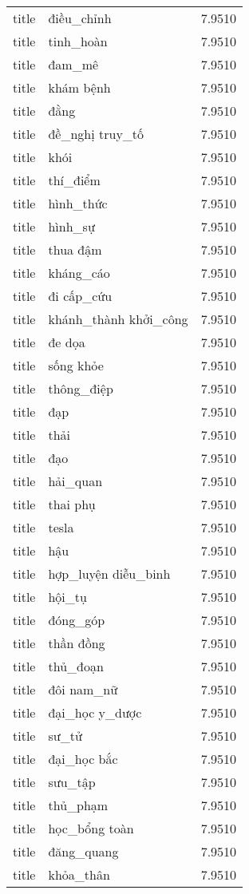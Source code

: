\documentclass{article}
\begin{document}
\begin{tabular}{lll}
title & điều\_chỉnh & 7.9510\\
title & tinh\_hoàn & 7.9510\\
title & đam\_mê & 7.9510\\
title & khám bệnh & 7.9510\\
title & đằng & 7.9510\\
title & đề\_nghị truy\_tố & 7.9510\\
title & khói & 7.9510\\
title & thí\_điểm & 7.9510\\
title & hình\_thức & 7.9510\\
title & hình\_sự & 7.9510\\
title & thua đậm & 7.9510\\
title & kháng\_cáo & 7.9510\\
title & đi cấp\_cứu & 7.9510\\
title & khánh\_thành khởi\_công & 7.9510\\
title & đe dọa & 7.9510\\
title & sống khỏe & 7.9510\\
title & thông\_điệp & 7.9510\\
title & đạp & 7.9510\\
title & thải & 7.9510\\
title & đạo & 7.9510\\
title & hải\_quan & 7.9510\\
title & thai phụ & 7.9510\\
title & tesla & 7.9510\\
title & hậu & 7.9510\\
title & hợp\_luyện diễu\_binh & 7.9510\\
title & hội\_tụ & 7.9510\\
title & đóng\_góp & 7.9510\\
title & thần đồng & 7.9510\\
title & thủ\_đoạn & 7.9510\\
title & đôi nam\_nữ & 7.9510\\
title & đại\_học y\_dược & 7.9510\\
title & sư\_tử & 7.9510\\
title & đại\_học bắc & 7.9510\\
title & sưu\_tập & 7.9510\\
title & thủ\_phạm & 7.9510\\
title & học\_bổng toàn & 7.9510\\
title & đăng\_quang & 7.9510\\
title & khỏa\_thân & 7.9510\\

\end{tabular}
\end{document}
